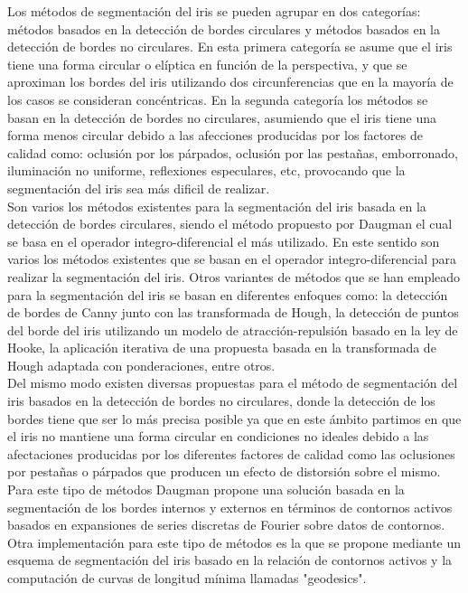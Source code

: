 Los métodos de segmentación del iris se pueden agrupar en dos categorías: métodos basados en la detección de bordes circulares y métodos basados en la detección de bordes no circulares. En esta primera categoría se asume que el iris tiene una forma circular o elíptica en función de la perspectiva, y que se aproximan los bordes del iris utilizando dos circunferencias que en la mayoría de los casos se consideran concéntricas. En la segunda categoría los métodos se basan en la detección de bordes no circulares, asumiendo que el iris tiene una forma menos circular debido a las afecciones producidas por los factores de calidad como: oclusión por los párpados, oclusión por las pestañas, emborronado, iluminación no uniforme, reflexiones especulares, etc, provocando que la segmentación del iris sea más dificil de realizar. \\

Son varios los métodos existentes para la segmentación del iris basada en la detección de bordes circulares, siendo el método propuesto por Daugman el cual se basa en el operador integro-diferencial el más utilizado. En este sentido son varios los métodos existentes que se basan en el operador integro-diferencial para realizar la segmentación del iris. Otros variantes de métodos que se han empleado para la segmentación del iris se basan en diferentes enfoques como: la detección de bordes de Canny junto con las transformada de Hough, la detección de puntos del borde del iris utilizando un modelo de atracción-repulsión basado en la ley de Hooke, la aplicación iterativa de una propuesta basada en la transformada de Hough adaptada con ponderaciones, entre otros. \\

Del mismo modo existen diversas propuestas para el método de segmentación del iris basados en la detección de bordes no circulares, donde la detección de los bordes tiene que ser lo más precisa posible ya que en este ámbito partimos en que el iris no mantiene una forma circular en condiciones no ideales debido a las afectaciones producidas por los diferentes factores de calidad como las oclusiones por pestañas o párpados que producen un efecto de distorsión sobre el mismo. Para este tipo de métodos Daugman propone una solución basada en la segmentación de los bordes internos y externos en términos de contornos activos basados en expansiones de series discretas de Fourier sobre datos de contornos. Otra implementación para este tipo de métodos es la que se propone mediante un esquema de segmentación del iris basado en la relación de contornos activos y la computación de curvas de longitud mínima llamadas "geodesics". \\



